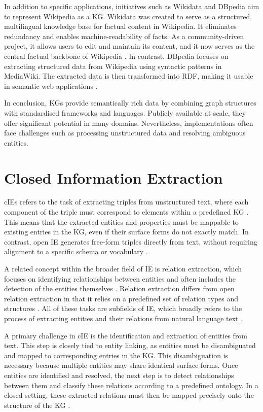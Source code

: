 \documentclass[a4paper,oneside,bibliography=totoc]{scrbook}
\begin{document}
In addition to specific applications, initiatives such as Wikidata and DBpedia aim to represent Wikipedia as a \ac{KG}. Wikidata was created to serve as a structured, multilingual knowledge base for factual content in Wikipedia. It eliminates redundancy and enables machine-readability of facts. As a community-driven project, it allows users to edit and maintain its content, and it now serves as the central factual backbone of Wikipedia \cite{Vrandecic2014}. In contrast, DBpedia focuses on extracting structured data from Wikipedia using syntactic patterns in MediaWiki. The extracted data is then transformed into \ac{RDF}, making it usable in semantic web applications \cite{Auer2007}.

In conclusion, \acp{KG} provide semantically rich data by combining graph structures with standardised frameworks and languages. Publicly available at scale, they offer significant potential in many domains. Nevertheless, implementations often face challenges such as processing unstructured data and resolving ambiguous entities.


\section{Closed Information Extraction}
\label{sec:closed_information_extraction}

\makeatletter
{}
\makeatother

\Acp{cIE} refers to the task of extracting triples from unstructured text, where each component of the triple must correspond to elements within a predefined \ac{KG} \cite{Josifoski2021}. This means that the extracted entities and properties must be mappable to existing entries in the \ac{KG}, even if their surface forms do not exactly match. In contrast, open \ac{IE} generates free-form triples directly from text, without requiring alignment to a specific schema or vocabulary \cite{Etzioni2008}.

A related concept within the broader field of \ac{IE} is relation extraction, which focuses on identifying relationships between entities and often includes the detection of the entities themselves \cite{Zhao2024}. Relation extraction differs from open relation extraction in that it relies on a predefined set of relation types and structures \cite{Kamp2023}. All of these tasks are subfields of \ac{IE}, which broadly refers to the process of extracting entities and their relations from natural language text \cite{Etzioni2008}.

A primary challenge in \ac{cIE} is the identification and extraction of entities from text. This step is closely tied to entity linking, as entities must be disambiguated and mapped to corresponding entries in the \ac{KG}. This disambiguation is necessary because multiple entities may share identical surface forms. Once entities are identified and resolved, the next step is to detect relationships between them and classify these relations according to a predefined ontology. In a closed setting, these extracted relations must then be mapped precisely onto the structure of the \ac{KG} \cite{Josifoski2021,Zhao2024}.
\end{document}
